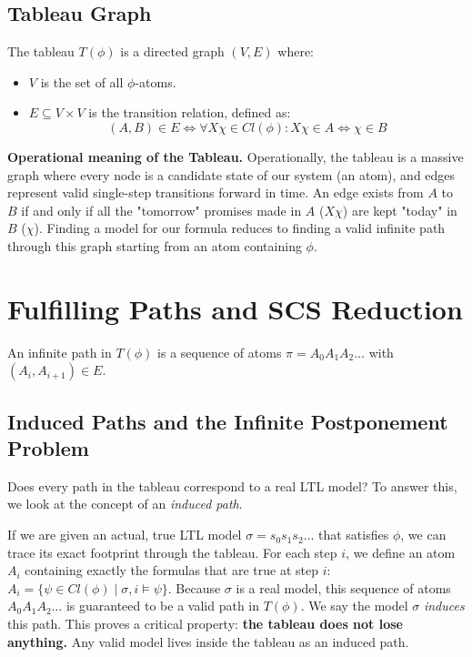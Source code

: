 \subsection{Tableau Graph}
\begin{definition}[Tableau]
The tableau $T(\phi)$ is a directed graph $(V, E)$ where:
\begin{itemize}
    \item $V$ is the set of all $\phi$-atoms.
    \item $E \subseteq V \times V$ is the transition relation, defined as:
          \[
            (A, B) \in E \iff \forall X\chi \in Cl(\phi) : X\chi \in A \iff \chi \in B
          \]
\end{itemize}
\end{definition}

\medskip\noindent
\textbf{Operational meaning of the Tableau.} Operationally, the tableau is a massive graph where every node is a candidate state of our system (an atom), and edges represent valid single-step transitions forward in time. An edge exists from $A$ to $B$ if and only if all the "tomorrow" promises made in $A$ ($X\chi$) are kept "today" in $B$ ($\chi$). Finding a model for our formula reduces to finding a valid infinite path through this graph starting from an atom containing $\phi$.

\section{Fulfilling Paths and SCS Reduction}
\label{sec:ltl-fulfilling}

An infinite path in $T(\phi)$ is a sequence of atoms $\pi = A_0 A_1 A_2 \dots$ with $(A_i, A_{i+1}) \in E$.

\subsection{Induced Paths and the Infinite Postponement Problem}
Does every path in the tableau correspond to a real LTL model? To answer this, we look at the concept of an \emph{induced path}.

If we are given an actual, true LTL model $\sigma = s_0 s_1 s_2 \dots$ that satisfies $\phi$, we can trace its exact footprint through the tableau. For each step $i$, we define an atom $A_i$ containing exactly the formulas that are true at step $i$: $A_i = \{ \psi \in Cl(\phi) \mid \sigma, i \models \psi \}$. Because $\sigma$ is a real model, this sequence of atoms $A_0 A_1 A_2 \dots$ is guaranteed to be a valid path in $T(\phi)$. We say the model $\sigma$ \emph{induces} this path. This proves a critical property: \textbf{the tableau does not lose anything.} Any valid model lives inside the tableau as an induced path.

